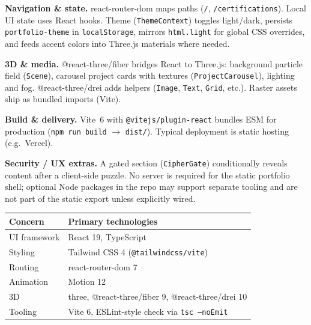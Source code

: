 \documentclass[10pt,a4paper]{article}
\begin{document}
\textbf{Navigation \& state.} \textsf{react-router-dom} maps paths (\texttt{/}, \texttt{/certifications}). Local UI state uses React hooks. Theme (\texttt{ThemeContext}) toggles light/dark, persists \texttt{portfolio-theme} in \texttt{localStorage}, mirrors \texttt{html.light} for global CSS overrides, and feeds accent colors into Three.js materials where needed.

\textbf{3D \& media.} \textsf{@react-three/fiber} bridges React to \textsf{Three.js}: background particle field (\texttt{Scene}), carousel project cards with textures (\texttt{ProjectCarousel}), lighting and fog. \textsf{@react-three/drei} adds helpers (\texttt{Image}, \texttt{Text}, \texttt{Grid}, etc.). Raster assets ship as bundled imports (Vite).

\textbf{Build \& delivery.} \textsf{Vite~6} with \texttt{@vitejs/plugin-react} bundles ESM for production (\texttt{npm run build} $\rightarrow$ \texttt{dist/}). Typical deployment is static hosting (e.g.\ Vercel).

\textbf{Security / UX extras.} A gated section (\texttt{CipherGate}) conditionally reveals content after a client-side puzzle. No server is required for the static portfolio shell; optional Node packages in the repo may support separate tooling and are not part of the static export unless explicitly wired.

\vspace{0.25em}
\begin{table}[h]
  \centering
  \scriptsize
  \begin{tabular}{@{}ll@{}}
    \toprule
    \textbf{Concern} & \textbf{Primary technologies} \\
    \midrule
    UI framework & React 19, TypeScript \\
    Styling & Tailwind CSS 4 (\texttt{@tailwindcss/vite}) \\
    Routing & react-router-dom 7 \\
    Animation & Motion 12 \\
    3D & three, @react-three/fiber 9, @react-three/drei 10 \\
    Tooling & Vite 6, ESLint-style check via \texttt{tsc --noEmit} \\
    \bottomrule
  \end{tabular}
\end{table}
\end{document}

